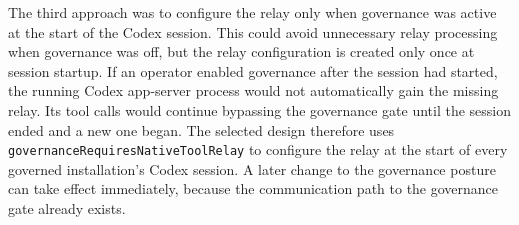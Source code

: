 The third approach was to configure the relay only when governance was active
at the start of the Codex session. This could avoid unnecessary relay processing
when governance was off, but the relay configuration is created only once at session startup. If an operator enabled governance after the session had
started, the running Codex app-server process would not automatically gain the
missing relay. Its tool calls would continue bypassing the governance gate until
the session ended and a new one began. The selected design therefore uses
\texttt{governanceRequiresNativeToolRelay} to configure the relay at the start
of every governed installation's Codex session. A later change to the
governance posture can take effect immediately, because the communication
path to the governance gate already exists.
\begin{figure}[htbp]
\centering
{}
\end{figure}
